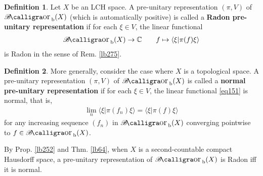 \documentclass[12pt,b5paper,notitlepage]{article}
\theoremstyle{definition}
\newtheorem{df}{Definition}[subsection]
\theoremstyle{plain}
\newtheorem{pp}[df]{Proposition}
\DeclareMathOperator{\Borb}{{\mathscr{B}\text{\kern -2pt {\calligra\large or}}\,}_{\mathrm b}}
\newcommand{\fk}{\mathfrak}
\newcommand{\id}{\mathrm{id}}
\newcommand{\bk}[1]{\langle {#1}\rangle}
\newcommand{\scr}{\mathscr}
\newcommand{\Cbb}{\mathbb C}
\newcommand{\hqed}{\hfill\qedsymbol}
\numberwithin{equation}{section}
\begin{document}
\begin{comment}
\begin{pp}
Let $X$ be a set. Let $\scr A$ be a unital *-subalgebra of $l^\infty(X)$. Let $(\pi,V)$ be a \uwave{positive} pre-unitary representation of $\scr A$. Then the linear map $\pi:\scr A\rightarrow\fk L(V)$ is bounded with operator norm $1$.
\end{pp}


Consequently, if $X$ is a compact Hausdorff space, any pre-unitary representation of $C(X)$ or $\Borb(X)$ has operator norm $\leq 1$.

\begin{proof}
Since $(\pi,V)$ is positive, for each $\xi\in V$, the linear functional
\begin{align*}
\Lambda_\xi:\scr A\rightarrow\Cbb\qquad f\mapsto\bk{\xi|\pi(f)\xi}
\end{align*}
is positive. Therefore, by Prop. \ref{lb204}, for each $f\in\scr A$ we have $|\Lambda_\xi(f)|\leq\Vert f\Vert_{l^\infty}\cdot\Lambda_\xi(1)$, i.e.,
\begin{align*}
|\bk{\xi|\pi(f)\xi}|\leq \Vert f\Vert_{l^\infty}\cdot\Vert\xi\Vert^2
\end{align*}
Since $\Vert f^*f\Vert_{l^\infty}=\Vert f\Vert_{l^\infty}^2$, we obtain
\begin{align*}
\bk{\pi(f)\xi|\pi(f)\xi}=\bk{\xi|\pi(f^*f)\xi}\leq\Vert f\Vert_{l^\infty}^2\cdot\Vert\xi\Vert^2
\end{align*}
and hence $\Vert\pi(f)\Vert\leq\Vert f\Vert_{l^\infty}$. This shows that $\Vert\pi\Vert\leq 1$. Since $\pi(1)=\id$, we 
\end{proof}
\end{comment}


\begin{df}
Let $X$ be an LCH space. A pre-unitary representation $(\pi,V)$ of $\Borb(X)$ (which is automatically positive) is called a \textbf{Radon pre-unitary representation}  if for each $\xi\in V$, the linear functional
\begin{align}\label{eq151}
\Borb(X)\rightarrow\Cbb\qquad f\mapsto\bk{\xi|\pi(f)\xi}
\end{align}
is Radon in the sense of Rem. \ref{lb275}. 
\end{df}



\begin{df}\label{lb433}
More generally, consider the case where $X$ is a topological space. A pre-unitary representation $(\pi,V)$ of $\Borb(X)$ is called a \textbf{normal pre-unitary representation}  if for each $\xi\in V$, the linear functional \eqref{eq151} is normal, that is,
\begin{align*}
\lim_n\bk{\xi|\pi(f_n)\xi}=\bk{\xi|\pi(f)\xi}
\end{align*}
for any increasing sequence $(f_n)$ in $\Borb(X)$ converging pointwise to $f\in\Borb(X)$.

By Prop. \ref{lb252} and Thm. \ref{lb64}, when $X$ is a second-countable compact Hausdorff space, a pre-unitary representation of $\Borb(X)$ is Radon iff it is normal.  \hqed
\end{df}
\end{document}
